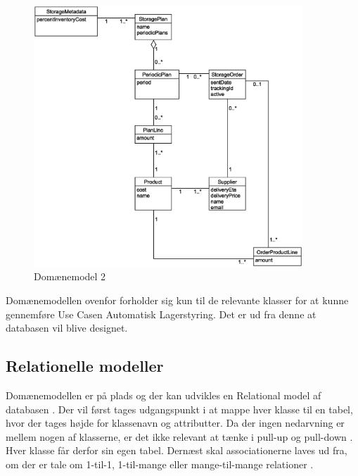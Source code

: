 \begin{figure}[H]
    \centering
    \includegraphics[width=0.9\textwidth]{figures/krav/domain_model_2.eps}
    \caption{Domænemodel 2}
    \label{fig:domain_model_2}
\end{figure}

Domænemodellen ovenfor forholder sig kun til de relevante klasser for at kunne gennemføre Use Casen Automatisk Lagerstyring. Det er ud fra denne at databasen vil blive designet.

\subsection{Relationelle modeller}
Domænemodellen er på plads og der kan udvikles en Relational model af databasen \cite{DatabaseSystems}. Der vil først tages udgangspunkt i at mappe hver klasse til en tabel, hvor der tages højde for klassenavn og attributter.
Da der ingen nedarvning er mellem nogen af klasserne, er det ikke relevant at tænke i pull-up og pull-down \cite{Larman2004}. Hver klasse får derfor sin egen tabel.
Dernæst skal associationerne laves ud fra, om der er tale om 1-til-1, 1-til-mange eller mange-til-mange relationer \cite{DatabaseSystems}. 

